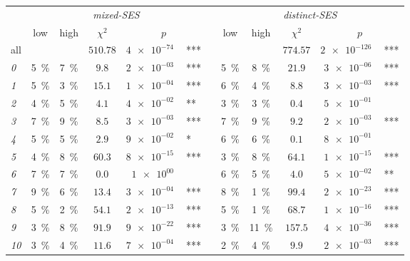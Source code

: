 \begin{tabular}{lcccr@{\hskip0pt}llcccr@{\hskip0pt}l}\toprule & \multicolumn{5}{c}{\textit{mixed-SES}} && \multicolumn{5}{c}{\textit{distinct-SES}} \\ & low & high & $\chi^2$ & \multicolumn{2}{c}{$p$} && low & high & $\chi^2$ & \multicolumn{2}{c}{$p$} \\\toprule
all & & & $510.78$ & $\SI{4e-74}{}$ & *** && && $774.57$ & $\SI{2e-126}{}$ & *** \\
\textit{0} & \SI{5}{\percent} & \SI{7}{\percent} & $9.8$ & $\SI{2e-03}{}$ & *** && \SI{5}{\percent} & \SI{8}{\percent} & $21.9$ & $\SI{3e-06}{}$ & *** \\
\textit{1} & \SI{5}{\percent} & \SI{3}{\percent} & $15.1$ & $\SI{1e-04}{}$ & *** && \SI{6}{\percent} & \SI{4}{\percent} & $8.8$ & $\SI{3e-03}{}$ & *** \\
\textit{2} & \SI{4}{\percent} & \SI{5}{\percent} & $4.1$ & $\SI{4e-02}{}$ & ** && \SI{3}{\percent} & \SI{3}{\percent} & $0.4$ & $\SI{5e-01}{}$ &  \\
\textit{3} & \SI{7}{\percent} & \SI{9}{\percent} & $8.5$ & $\SI{3e-03}{}$ & *** && \SI{7}{\percent} & \SI{9}{\percent} & $9.2$ & $\SI{2e-03}{}$ & *** \\
\textit{4} & \SI{5}{\percent} & \SI{5}{\percent} & $2.9$ & $\SI{9e-02}{}$ & * && \SI{6}{\percent} & \SI{6}{\percent} & $0.1$ & $\SI{8e-01}{}$ &  \\
\textit{5} & \SI{4}{\percent} & \SI{8}{\percent} & $60.3$ & $\SI{8e-15}{}$ & *** && \SI{3}{\percent} & \SI{8}{\percent} & $64.1$ & $\SI{1e-15}{}$ & *** \\
\textit{6} & \SI{7}{\percent} & \SI{7}{\percent} & $0.0$ & $\SI{1e+00}{}$ &  && \SI{6}{\percent} & \SI{5}{\percent} & $4.0$ & $\SI{5e-02}{}$ & ** \\
\textit{7} & \SI{9}{\percent} & \SI{6}{\percent} & $13.4$ & $\SI{3e-04}{}$ & *** && \SI{8}{\percent} & \SI{1}{\percent} & $99.4$ & $\SI{2e-23}{}$ & *** \\
\textit{8} & \SI{5}{\percent} & \SI{2}{\percent} & $54.1$ & $\SI{2e-13}{}$ & *** && \SI{5}{\percent} & \SI{1}{\percent} & $68.7$ & $\SI{1e-16}{}$ & *** \\
\textit{9} & \SI{3}{\percent} & \SI{8}{\percent} & $91.9$ & $\SI{9e-22}{}$ & *** && \SI{3}{\percent} & \SI{11}{\percent} & $157.5$ & $\SI{4e-36}{}$ & *** \\
\textit{10} & \SI{3}{\percent} & \SI{4}{\percent} & $11.6$ & $\SI{7e-04}{}$ & *** && \SI{2}{\percent} & \SI{4}{\percent} & $9.9$ & $\SI{2e-03}{}$ & *** \\

\end{tabular}
